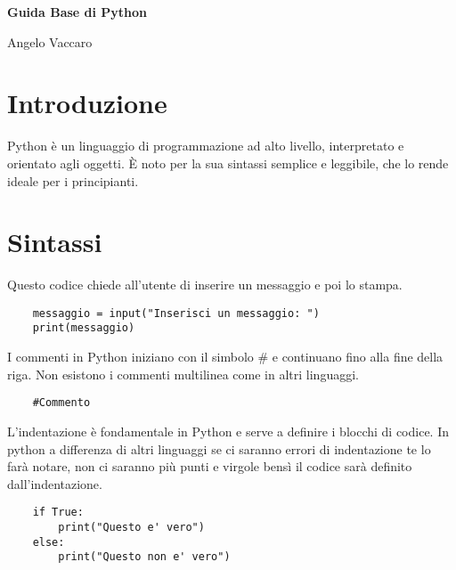 \documentclass[a4paper,12pt]{article}
\begin{document}
\begin{titlepage}
    \centering
    \vspace*{5cm}
    {\Huge\bfseries Guida Base di Python\par}
    \vfill
    \begin{flushright}
        \large Angelo Vaccaro
    \end{flushright}
\end{titlepage}

\tableofcontents
\newpage

\section{Introduzione}
Python è un linguaggio di programmazione ad alto livello,
interpretato e orientato agli oggetti. È noto per la sua sintassi
semplice e leggibile, che lo rende ideale per i principianti.
\newpage
\section{Sintassi}
Questo codice chiede all'utente di inserire un messaggio e poi lo stampa.
\begin{lstlisting}
    messaggio = input("Inserisci un messaggio: ")
    print(messaggio)
\end{lstlisting}
\vspace{1em}
I commenti in Python iniziano con il simbolo \# e continuano fino alla fine della riga.
Non esistono i commenti multilinea come in altri linguaggi.
\begin{lstlisting}
    #Commento
\end{lstlisting}
\vspace{1em}
L'indentazione è fondamentale in Python e serve a definire i blocchi di codice. In python a differenza di altri linguaggi se ci saranno errori di indentazione te lo farà notare, non ci saranno più punti e virgole bensì il codice sarà definito dall'indentazione.
\begin{lstlisting}
    if True:
        print("Questo e' vero")
    else:
        print("Questo non e' vero")
\end{lstlisting}
\vspace{1em}
\newpage
\end{document}
